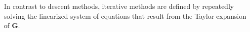 
In contrast to descent methods,
iterative methods are defined by repeatedly
solving the linearized system of equations that result
from the Taylor expansion of $\mathbf{G}$.


